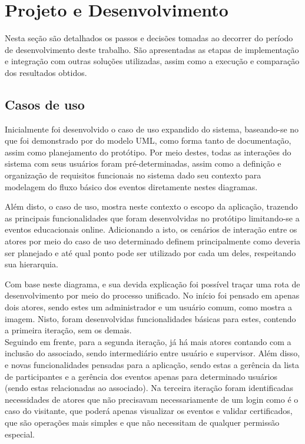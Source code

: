 \chapter{Projeto e Desenvolvimento}\label{chp:LABEL_CHP_4}
Nesta seção são detalhados os passos e decisões tomadas ao decorrer do período de desenvolvimento deste trabalho. São apresentadas as etapas de implementação e integração com outras soluções utilizadas, assim como a execução e comparação dos resultados obtidos.

\section{Casos de uso}
Inicialmente foi desenvolvido o caso de uso expandido do sistema, baseando-se no que foi demonstrado por  do modelo UML, como forma tanto de documentação, assim como planejamento do protótipo. Por meio destes, todas as interações do sistema com seus usuários foram pré-determinadas, assim como a definição e organização de requisitos funcionais no sistema dado seu contexto para modelagem do fluxo básico dos eventos diretamente nestes diagramas.

Além disto, o caso de uso, mostra neste contexto o escopo da aplicação, trazendo as principais funcionalidades que foram desenvolvidas no protótipo limitando-se a eventos educacionais online. Adicionando a isto, os cenários de interação entre os atores por meio do caso de uso determinado definem principalmente como deveria ser planejado e até qual ponto pode ser utilizado por cada um deles, respeitando sua hierarquia. 

Com base neste diagrama, e sua devida explicação foi possível traçar uma rota de desenvolvimento por meio do processo unificado. No início foi pensado em apenas dois atores, sendo estes um administrador e um usuário comum, como mostra a imagem. Nisto, foram desenvolvidas funcionalidades básicas para estes, contendo a primeira iteração, sem os demais. \\
Seguindo em frente, para a segunda iteração, já há mais atores contando com a inclusão do associado, sendo intermediário entre usuário e supervisor. Além disso, e novas funcionalidades pensadas para a aplicação, sendo estas a gerência da lista de participantes e a gerência dos eventos apenas para determinado usuários (sendo estas relacionadas ao associado).
Na terceira iteração foram identificadas necessidades de atores que não precisavam necessariamente de um login como é o caso do visitante, que poderá apenas visualizar os eventos e validar certificados, que são operações mais simples e que não necessitam de qualquer permissão especial. 

